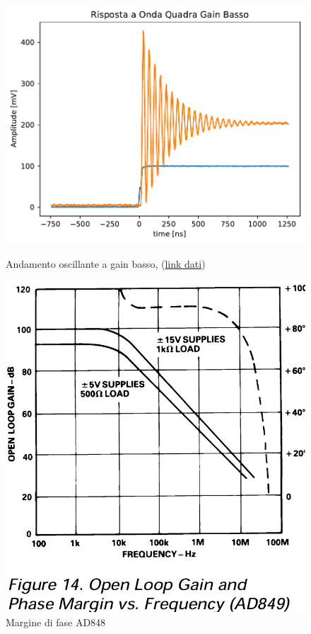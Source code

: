 \begin{figure}[!h]
    \begin{minipage}{.5\linewidth}
        \centering
        \includegraphics[width=.8\linewidth]{assets/AD848/Non Invertente/Non_inv_low_gain.pdf}
        \caption{Andamento oscillante a gain basso, (\href{https://github.com/Yedi278/Esperimentazioni-Elettronica/tree/main/-\%20OPAMP/AD848/Non-Invertente/R1\%202.2k\%20R2\%202.2k}{link dati})}
    \end{minipage}
    \begin{minipage}{0.5\linewidth}
        \centering
        \includegraphics[width=.6\linewidth]{assets/AD848/AD848_PhaseMargin.png}
        \caption{Margine di fase AD848}
    \end{minipage}
\end{figure}

